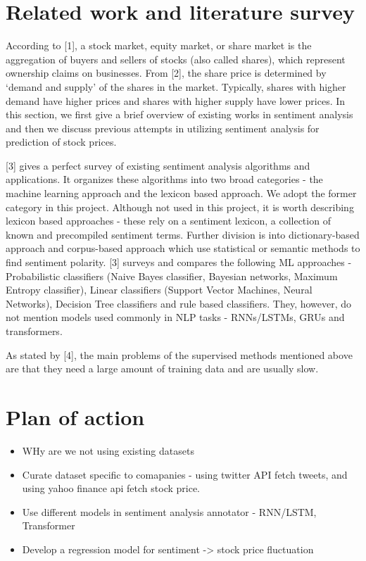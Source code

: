 \documentclass{article}
\begin{document}
\section{Related work and literature survey}
    According to [1], a stock market, equity market, or share market is the aggregation of buyers and sellers of stocks (also called shares), which represent ownership claims on businesses. From [2], the share price is determined by `demand and supply' of the shares in the market. Typically, shares with higher demand have higher prices and shares with higher supply have lower prices. In this section, we first give a brief overview of existing works in sentiment analysis and then we discuss previous attempts in utilizing sentiment analysis for prediction of stock prices. 

    [3] gives a perfect survey of existing sentiment analysis algorithms and applications. It organizes these algorithms into two broad categories - the machine learning approach and the lexicon based approach. We adopt the former category in this project. Although not used in this project, it is worth describing lexicon based approaches - these rely on a sentiment lexicon, a collection of known and precompiled sentiment terms. Further division is into dictionary-based approach and corpus-based approach which use statistical or semantic methods to find sentiment polarity. [3] surveys and compares the following ML approaches - Probabilistic classifiers (Naive Bayes classifier, Bayesian networks, Maximum Entropy classifier), Linear classifiers (Support Vector Machines, Neural Networks), Decision Tree classifiers and rule based classifiers. They, however, do not mention models used commonly in NLP tasks - RNNs/LSTMs, GRUs and transformers. 

    As stated by [4], the main problems of the supervised methods mentioned above are that they need a large amount of training data and are usually slow. 

\section{Plan of action}
\begin{itemize}
    \item WHy are we not using existing datasets
    \item Curate dataset specific to comapanies - using twitter API fetch tweets, and using yahoo finance api fetch stock price.
    \item Use different models in sentiment analysis annotator - RNN/LSTM, Transformer
    \item Develop a regression model for sentiment -> stock price fluctuation
\end{itemize}
\end{document}
